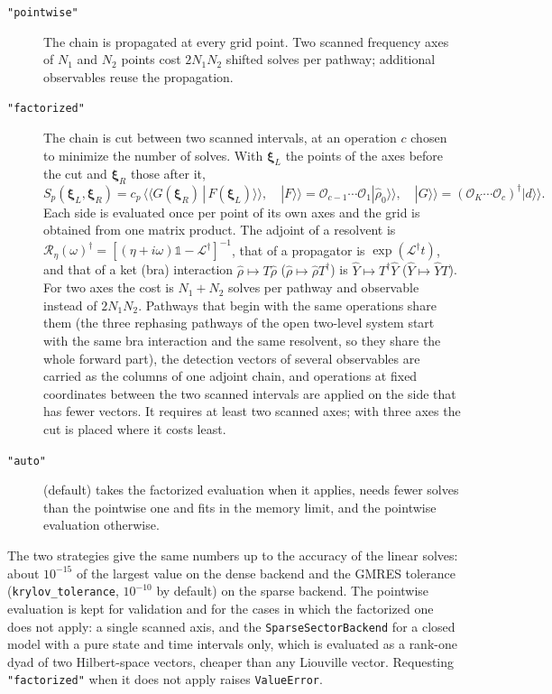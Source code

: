 \documentclass[11pt]{article}
\begin{document}
\begin{description}
    \item[\texttt{"pointwise"}] The chain is propagated at every grid point. Two scanned frequency axes of $N_1$ and $N_2$ points cost $2N_1N_2$ shifted solves per pathway; additional observables reuse the propagation.
    \item[\texttt{"factorized"}] The chain is cut between two scanned intervals, at an operation $c$ chosen to minimize the number of solves. With $\boldsymbol{\xi}_L$ the points of the axes before the cut and $\boldsymbol{\xi}_R$ those after it,
    \begin{equation}
        S_p(\boldsymbol{\xi}_L,\boldsymbol{\xi}_R)
        = c_p\,\langle\!\langle G(\boldsymbol{\xi}_R)\,|\,F(\boldsymbol{\xi}_L)\rangle\!\rangle,
        \quad
        |F\rangle\!\rangle=\mathcal{O}_{c-1}\cdots\mathcal{O}_1|\hat{\rho}_0\rangle\!\rangle,
        \quad
        |G\rangle\!\rangle=(\mathcal{O}_K\cdots\mathcal{O}_c)^\dagger|d\rangle\!\rangle .
    \end{equation}
    Each side is evaluated once per point of its own axes and the grid is obtained from one matrix product. The adjoint of a resolvent is $\mathcal{R}_\eta(\omega)^\dagger=[(\eta+i\omega)\mathbb{1}-\mathcal{L}^\dagger]^{-1}$, that of a propagator is $\exp(\mathcal{L}^\dagger t)$, and that of a ket (bra) interaction $\hat\rho\mapsto T\hat\rho$ ($\hat\rho\mapsto\hat\rho T^\dagger$) is $\hat Y\mapsto T^\dagger\hat Y$ ($\hat Y\mapsto\hat Y T$). For two axes the cost is $N_1+N_2$ solves per pathway and observable instead of $2N_1N_2$. Pathways that begin with the same operations share them (the three rephasing pathways of the open two-level system start with the same bra interaction and the same resolvent, so they share the whole forward part), the detection vectors of several observables are carried as the columns of one adjoint chain, and operations at fixed coordinates between the two scanned intervals are applied on the side that has fewer vectors. It requires at least two scanned axes; with three axes the cut is placed where it costs least.
    \item[\texttt{"auto"}] (default) takes the factorized evaluation when it applies, needs fewer solves than the pointwise one and fits in the memory limit, and the pointwise evaluation otherwise.
\end{description}

The two strategies give the same numbers up to the accuracy of the linear solves: about $10^{-15}$ of the largest value on the dense backend and the GMRES tolerance (\texttt{krylov\_tolerance}, $10^{-10}$ by default) on the sparse backend. The pointwise evaluation is kept for validation and for the cases in which the factorized one does not apply: a single scanned axis, and the \texttt{SparseSectorBackend} for a closed model with a pure state and time intervals only, which is evaluated as a rank-one dyad of two Hilbert-space vectors, cheaper than any Liouville vector. Requesting \texttt{"factorized"} when it does not apply raises \texttt{ValueError}.
\end{document}
